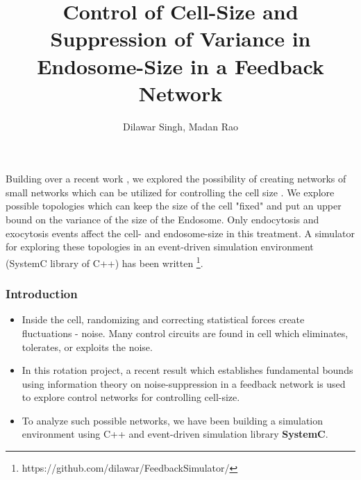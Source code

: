 \documentclass{beamer}
\title{Control of Cell-Size and Suppression of Variance in Endosome-Size in a
Feedback Network}
\author{Dilawar Singh, Madan Rao}
\date{}
\begin{document}
\begin{frame}
    \maketitle

    \small
    Building over a recent work \cite{paulsson}, we explored the possibility of
    creating networks of small networks which can be utilized for controlling
    the cell size . We explore possible topologies which can keep the size of
    the cell "fixed" and put an upper bound on the variance of the size of the
    Endosome. Only endocytosis and exocytosis events affect the cell- and
    endosome-size in this treatment.  A simulator for exploring these topologies
    in an event-driven simulation environment (SystemC library of C++) has been
    written \footnote{https://github.com/dilawar/FeedbackSimulator/}.

\end{frame}

\begin{frame}
    \frametitle{Introduction}

    \begin{itemize} 

        \item Inside the cell, randomizing and correcting statistical forces
            create fluctuations - noise. Many control circuits are found in cell
            which eliminates, tolerates, or exploits the noise.  

        \item In this rotation project, a recent result \cite{paulsson} which
            establishes fundamental bounds using information theory on
            noise-suppression in a feedback network is used to explore control
            networks for controlling cell-size.

        \item To analyze such possible networks, we have been building a
            simulation environment using C++ and event-driven simulation library
            \textbf{SystemC}.

    \end{itemize}

    
\end{frame}
\end{document}
